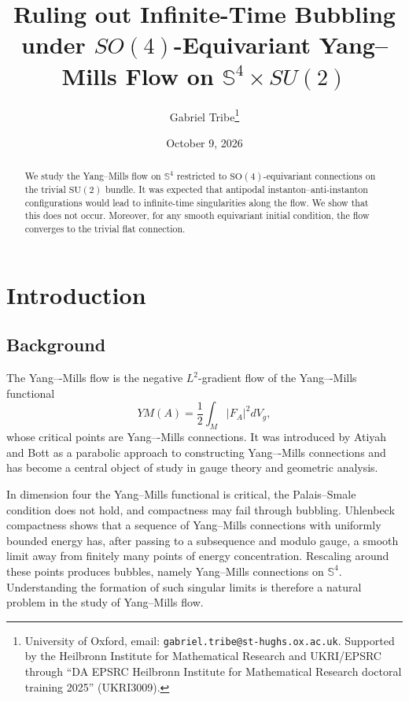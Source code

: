 \documentclass[11pt,a4paper]{article}
\title{Ruling out Infinite-Time Bubbling under $SO(4)$-Equivariant Yang--Mills Flow on $\mathbb{S}^4\times SU(2)$}
\author{Gabriel Tribe\thanks{University of Oxford, email: \texttt{gabriel.tribe@st-hughs.ox.ac.uk}.
Supported by the Heilbronn Institute for Mathematical Research and UKRI/EPSRC
through ``DA EPSRC Heilbronn Institute for Mathematical Research doctoral
training 2025'' (UKRI3009).}}
\date{October 9, 2026}
\numberwithin{equation}{section}
\theoremstyle{plain}
\theoremstyle{remark}
\begin{document}
\maketitle


 \begin{abstract}
We study the Yang--Mills flow on $\mathbb{S}^4$ restricted to
$\mathrm{SO}(4)$-equivariant connections on the trivial $\mathrm{SU}(2)$ bundle.
It was expected that antipodal instanton--anti-instanton configurations would lead to infinite-time singularities along the flow. We show that this does not occur. Moreover, for any smooth equivariant initial condition, the flow converges to the trivial flat connection. 
\end{abstract}


\setcounter{tocdepth}{2}
\tableofcontents
\bigskip

\section{Introduction}

\subsection{Background}

The Yang–-Mills flow is the negative $L^2$-gradient flow of the Yang–-Mills functional
$$
YM(A)=\frac 1 2\int_M |F_A|^2dV_g,
$$
whose critical points are Yang–-Mills connections. It was introduced by Atiyah and Bott as a parabolic approach to constructing Yang–-Mills connections and has become a central object of study in gauge theory and geometric analysis.

In dimension four the Yang--Mills functional is critical, the Palais--Smale
condition does not hold, and compactness may fail through bubbling.
Uhlenbeck compactness shows that a sequence of Yang--Mills connections with
uniformly bounded energy has, after passing to a subsequence and modulo gauge,
a smooth limit away from finitely many points of energy concentration.
Rescaling around these points produces bubbles, namely Yang--Mills connections on $\mathbb S^4$. Understanding the formation of such singular limits is therefore a natural problem in the study of Yang--Mills flow.
\end{document}
